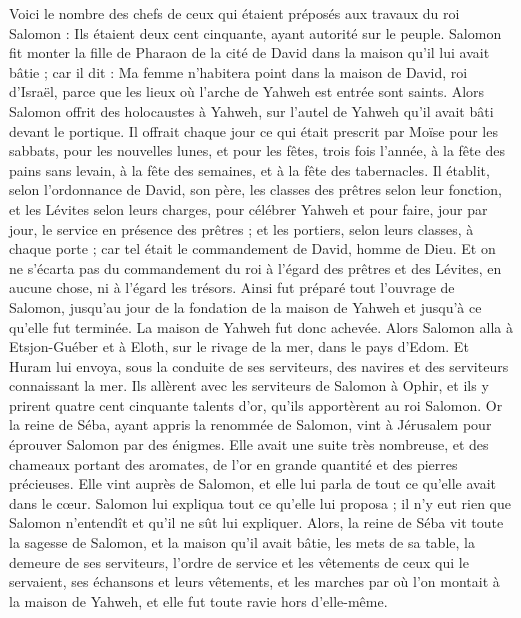 \begin{multicols}{2}
Voici le nombre des chefs de ceux qui étaient préposés aux travaux du roi Salomon : Ils étaient deux cent cinquante, ayant autorité sur le peuple.
Salomon fit monter la fille de Pharaon de la cité de David dans la maison qu'il lui avait bâtie ; car il dit : Ma femme n'habitera point dans la maison de David, roi d'Israël, parce que les lieux où l'arche de Yahweh est entrée sont saints.
Alors Salomon offrit des holocaustes à Yahweh, sur l'autel de Yahweh qu'il avait bâti devant le portique.
Il offrait chaque jour ce qui était prescrit par Moïse pour les sabbats, pour les nouvelles lunes, et pour les fêtes, trois fois l'année, à la fête des pains sans levain, à la fête des semaines, et à la fête des tabernacles.
Il établit, selon l'ordonnance de David, son père, les classes des prêtres selon leur fonction, et les Lévites selon leurs charges, pour célébrer Yahweh et pour faire, jour par jour, le service en présence des prêtres ; et les portiers, selon leurs classes, à chaque porte ; car tel était le commandement de David, homme de Dieu.
Et on ne s'écarta pas du commandement du roi à l'égard des prêtres et des Lévites, en aucune chose, ni à l'égard les trésors.
Ainsi fut préparé tout l'ouvrage de Salomon, jusqu'au jour de la fondation de la maison de Yahweh et jusqu'à ce qu'elle fut terminée. La maison de Yahweh fut donc achevée.
Alors Salomon alla à Etsjon-Guéber et à Eloth, sur le rivage de la mer, dans le pays d'Edom.
Et Huram lui envoya, sous la conduite de ses serviteurs, des navires et des serviteurs connaissant la mer. Ils allèrent avec les serviteurs de Salomon à Ophir, et ils y prirent quatre cent cinquante talents d'or, qu'ils apportèrent au roi Salomon.
\VerseOne{}Or la reine de Séba, ayant appris la renommée de Salomon, vint à Jérusalem pour éprouver Salomon par des énigmes. Elle avait une suite très nombreuse, et des chameaux portant des aromates, de l'or en grande quantité et des pierres précieuses. Elle vint auprès de Salomon, et elle lui parla de tout ce qu'elle avait dans le cœur.
Salomon lui expliqua tout ce qu'elle lui proposa ; il n'y eut rien que Salomon n'entendît et qu'il ne sût lui expliquer.
Alors, la reine de Séba vit toute la sagesse de Salomon, et la maison qu'il avait bâtie,
les mets de sa table, la demeure de ses serviteurs, l'ordre de service et les vêtements de ceux qui le servaient, ses échansons et leurs vêtements, et les marches par où l'on montait à la maison de Yahweh, et elle fut toute ravie hors d'elle-même.

\end{multicols}
